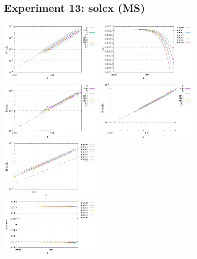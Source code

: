 \newpage
\subsection*{Experiment 13: solcx (MS)}

\begin{center}
\includegraphics[width=5cm]{python_codes/fieldstone_78/results/errors_u_exp13.pdf}
\includegraphics[width=5cm]{python_codes/fieldstone_78/results/vrms_exp13.pdf} \\
\includegraphics[width=5cm]{python_codes/fieldstone_78/results/errors_p_exp13.pdf}
\includegraphics[width=5cm]{python_codes/fieldstone_78/results/errors_q1_exp13.pdf}
\includegraphics[width=5cm]{python_codes/fieldstone_78/results/errors_q2_exp13.pdf}\\
\includegraphics[width=5cm]{python_codes/fieldstone_78/results/stats_u_exp13.pdf}

\end{center}
